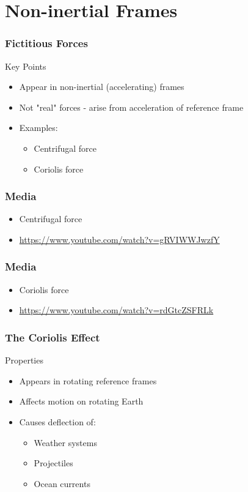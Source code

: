 \documentclass{beamer}
\begin{document}
\section{Non-inertial Frames}


\begin{frame}
\frametitle{Fictitious Forces}
\begin{block}{Key Points}
\begin{itemize}
\item Appear in non-inertial (accelerating) frames
\item Not "real" forces - arise from acceleration of reference frame
\item Examples:
  \begin{itemize}
  \item Centrifugal force
  \item Coriolis force
  \end{itemize}
\end{itemize}
\end{block}
\end{frame}
\begin{frame}
\frametitle{Media}
     \begin{itemize}
  \item Centrifugal force
  \item \hyperlink{https://www.youtube.com/watch?v=gRVIWWJwzfY}{https://www.youtube.com/watch?v=gRVIWWJwzfY}
  \end{itemize}
\end{frame}

\begin{frame}
\frametitle{Media}
     \begin{itemize}
  \item Coriolis force
  \item \hyperlink{https://www.youtube.com/watch?v=rdGtcZSFRLk}{https://www.youtube.com/watch?v=rdGtcZSFRLk}
  \end{itemize}
\end{frame}

\begin{frame}
\frametitle{The Coriolis Effect}
\begin{block}{Properties}
\begin{itemize}
\item Appears in rotating reference frames
\item Affects motion on rotating Earth
\item Causes deflection of:
  \begin{itemize}
  \item Weather systems
  \item Projectiles
  \item Ocean currents
  \end{itemize}
\end{itemize}
\end{block}
\end{frame}
\end{document}
